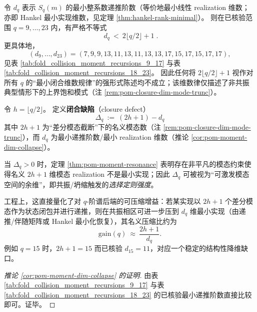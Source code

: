 \begin{corollary}[闭合维数外推在 \texorpdfstring{$q\ge 9$}{q>=9} 处失效（反例族）]\label{cor:pom-moment-dim-collapse}
令 \(d_q\) 表示 \(S_q(m)\) 的最小整系数递推阶数（等价地最小线性 realization 维数；亦即 Hankel 最小实现维数，见定理 \ref{thm:hankel-rank-minimal}）。
则在已核验范围 \(q=9,\dots,23\) 内，有严格不等式
\[
\boxed{\;
d_q\ <\ 2\lfloor q/2\rfloor+1\; }.
\]
更具体地，
\[
(d_9,\dots,d_{23})=(7,9,9,13,11,13,11,13,13,17,15,17,15,17,17),
\]
见表 \ref{tab:fold_collision_moment_recursions_9_17} 与表 \ref{tab:fold_collision_moment_recursions_18_23}。
因此任何将 \(2\lfloor q/2\rfloor+1\) 视作对所有 \(q\) 的“最小闭合维数规律”的强形式陈述均不成立；该维数律仅描述了非共振典型情形下的上界饱和模式（注 \ref{rem:pom-closure-dim-mode-trunc}）。
\end{corollary}
\begin{definition}\label{def:pom-closure-defect-deltaq}
令 \(h=\lfloor q/2\rfloor\)。
定义\textbf{闭合缺陷}（closure defect）
\[
\boxed{\;
\Delta_q\ :=\ (2h+1)-d_q\;}
\]
其中 \(2h+1\) 为“差分模态截断”下的名义模态数（注 \ref{rem:pom-closure-dim-mode-trunc}），而 \(d_q\) 为最小递推阶数/最小 realization 维数（推论 \ref{cor:pom-moment-dim-collapse}）。
\end{definition}
\begin{remark}\label{rem:pom-closure-defect-selection-rule}
当 \(\Delta_q>0\) 时，定理 \ref{thm:pom-moment-resonance} 表明存在非平凡的模态约束使得名义 \(2h+1\) 维模态 realization 不是最小实现；因此 \(\Delta_q\) 可被视为“可激发模态空间的余维”，即共振/坍缩触发的\emph{选择定则强度}。
\par
工程上，这直接量化了对 \(q\)-阶谱后端的可压缩增益：若某实现以 \(2h+1\) 个差分模态作为状态闭包并进行递推，则在共振相区可进一步压到 \(d_q\) 维最小实现（由递推/伴随矩阵或 Hankel 最小化恢复），其名义压缩比约为
\[
\mathrm{gain}(q)\ \approx\ \frac{2h+1}{d_q}.
\]
例如 \(q=15\) 时，\(2h+1=15\) 而已核验 \(d_{15}=11\)，对应一个稳定的结构性降维缺口。
\end{remark}
\begin{proof}[推论 \ref{cor:pom-moment-dim-collapse} 的证明]
由表 \ref{tab:fold_collision_moment_recursions_9_17} 与表 \ref{tab:fold_collision_moment_recursions_18_23} 的已核验最小递推阶数直接比较即可。证毕。
\end{proof}

